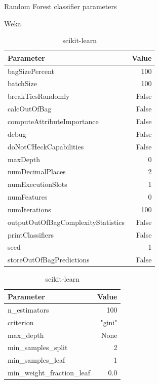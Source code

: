 \begin{table}[H]
    \footnotesize
    \centering
    \caption{Random Forest classifier parameters} \label{tab:rf_param}
    \begin{subtable}[t]{.5\linewidth}
        \caption{Weka \cite{noauthor_randomforest_nodate}}
        \centering
        \begin{tabular}{lr}\toprule
            Parameter & Value \\\midrule
            bagSizePercent & 100\\
            batchSize & 100 \\
            breakTiesRandomly & False \\
            calcOutOfBag & False \\
            computeAttributeImportance & False \\
            debug & False \\
            doNotCHeckCapabilities & False \\
            maxDepth & 0 \\
            numDecimalPlaces & 2 \\
            numExecutionSlots & 1 \\
            numFeatures & 0 \\
            numIterations & 100 \\
            outputOutOfBagComplexityStatistics & False \\
            printClassifiers & False \\
            seed & 1 \\
            storeOutOfBagPredictions & False \\\bottomrule
        \end{tabular}
    \end{subtable}%
    \begin{subtable}[t]{.5\linewidth}
        \caption{scikit-learn \cite{noauthor_sklearnensemblerandomforestclassifier_nodate}}
        \centering
        \begin{tabular}{lr}\toprule
            Parameter & Value \\\midrule
            n\_estimators & 100 \\
            criterion & "gini" \\
            max\_depth & None \\
            min\_samples\_split & 2 \\
            min\_samples\_leaf & 1 \\
            min\_weight\_fraction\_leaf & 0.0 \\

\end{tabular}
\end{subtable}
\end{table}
